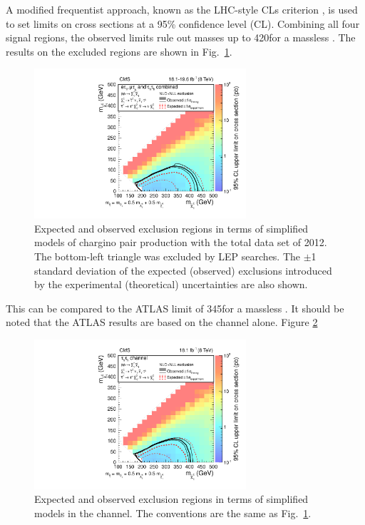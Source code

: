 A modified frequentist approach, known as the LHC-style CLs criterion \cite{read:CLs,Junk:1999kv,ATLAS:2011tau}, is used to 
set limits on cross sections at a 95\% confidence level (CL).
Combining all four signal regions,
the observed limits rule out \chione  masses up to  420\GeV  for a massless \PSGczDo.  
The results on the excluded regions are shown in Fig.~\ref{fig:limit_final}. 
\begin{linenomath}
\begin{figure}[!htb]
\centering
\includegraphics[width=0.7\textwidth,keepaspectratio=true]{StatisticsFig/Exclusion4Bins.pdf}
\caption{Expected and observed exclusion regions in terms of simplified models of
chargino pair production 
with the total data set of 2012. The bottom-left triangle was excluded by LEP \sTau searches.
The $\pm$1 standard deviation of the expected (observed) exclusions introduced by the experimental 
(theoretical) uncertainties are also shown.}
\label{fig:limit_final}
\end{figure}
\end{linenomath}
This can be compared to the ATLAS limit of 345\GeV for a massless \PSGczDo \cite{Aad:2014yka}.
It should be noted that the ATLAS results are based on the \tauTau channel alone. Figure 
\ref{fig:limit_tauTau} 
\begin{linenomath}
\begin{figure}[!htb]
\centering
\includegraphics[width=0.7\textwidth,keepaspectratio=true]{StatisticsFig/ExclusionTauTau2Bin.pdf}
\caption{Expected and observed exclusion regions in terms of simplified models
in the \tauTau channel. The conventions are the same as Fig.~\ref{fig:limit_final}.}
\label{fig:limit_tauTau}
\end{figure}
\end{linenomath}
